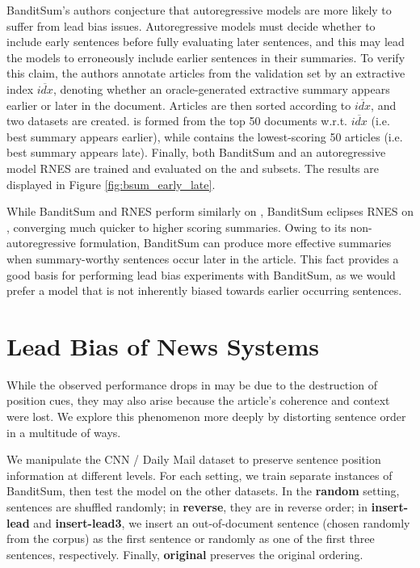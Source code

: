 BanditSum's authors conjecture that autoregressive models are more likely to suffer from lead bias issues. Autoregressive models must decide whether to include early sentences before fully evaluating later sentences, and this may lead the models to erroneously include earlier sentences in their summaries. To verify this claim, the authors annotate articles from the validation set by an extractive index $\overline{idx}$, denoting whether an oracle-generated extractive summary appears earlier or later in the document. Articles are then sorted according to  $\overline{idx}$, and two datasets are created. \Dearly{} is formed from the top 50 documents w.r.t. $\overline{idx}$ (i.e. best summary appears earlier), while \Dlate{} contains the lowest-scoring 50 articles (i.e. best summary appears late). Finally, both BanditSum and an autoregressive model RNES \parencite{DBLP:conf/aaai/WuH18} are trained and evaluated on the \Dearly{} and \Dlate{} subsets. The results are displayed in Figure \ref{fig:bsum_early_late}.

While BanditSum and RNES perform similarly on \Dearly{}, BanditSum eclipses RNES on \Dlate{}, converging much quicker to higher scoring summaries. Owing to its non-autoregressive formulation, BanditSum can produce more effective summaries when summary-worthy sentences occur later in the article. This fact provides a good basis for performing lead bias experiments with BanditSum, as we would prefer a model that is not inherently biased towards earlier occurring sentences.

\section{Lead Bias of News Systems}\label{sec:perturb}
While the observed performance drops in \cite{kedzie2018content} may be due to the destruction of position cues, they may also arise because the article's coherence and context were lost. We explore this phenomenon more deeply by distorting sentence order in a multitude of ways. 

We manipulate the CNN / Daily Mail dataset to preserve sentence position information at different levels. For each setting, we train separate instances of BanditSum, then test the model on the other datasets. In the \textbf{random} setting, sentences are shuffled randomly; in \textbf{reverse}, they are in reverse order; in \textbf{insert-lead} and \textbf{insert-lead3}, we insert an out-of-document sentence (chosen randomly from the corpus) as the first sentence or randomly as one of the first three sentences, respectively. Finally, \textbf{original} preserves the original ordering.

